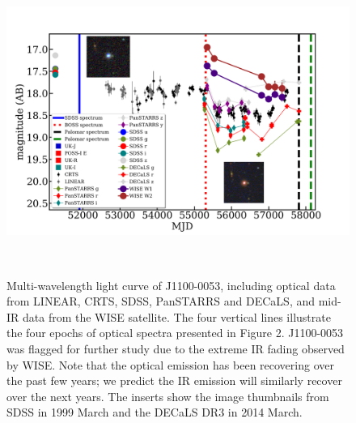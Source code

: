 \documentclass{nature}
\begin{document}
\begin{figure}
  \centering
  \includegraphics[width=16.00cm, height=10.00cm, trim=0.0cm 0.0cm 0.0cm 0.0cm, clip]
  {../plots/lc/J110057_lc_20180207.png}
  \caption[]{
    Multi-wavelength light curve of J1100-0053, including optical data
    from LINEAR, CRTS, SDSS, PanSTARRS and DECaLS, and mid-IR data from
    the WISE satellite.  The four vertical lines illustrate the four epochs of 
    optical spectra presented in Figure 2.  J1100-0053 was
    flagged for further study due to the extreme IR fading observed by
    WISE.  Note that the optical emission has been recovering over the
    past few years; we predict the IR emission will similarly recover over
    the next years. The inserts show the image thumbnails from SDSS in
    1999 March and the DECaLS DR3 in 2014 March.}
  \label{fig:J110057_LC_CRTS}
\end{figure}
\end{document}
